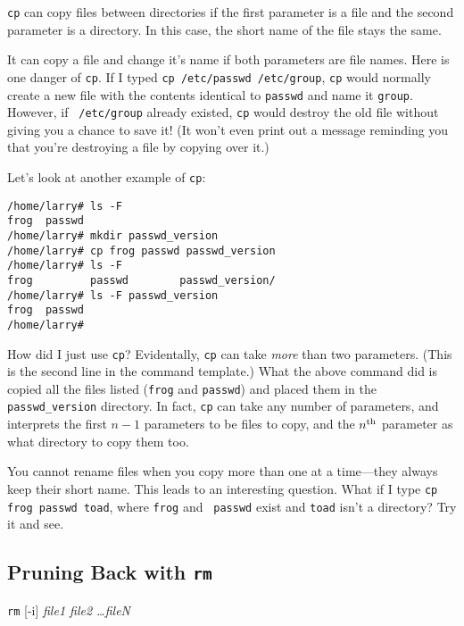 {\tt cp} can copy files between directories if the first parameter is a
file and the second parameter is a directory.  In this case, the short
name of the file stays the same.

It can copy a file and change it's name if both parameters are file
names. Here is one danger of {\tt cp}. If I typed {\tt cp /etc/passwd
/etc/group}, {\tt cp} would normally create a new file with the contents
identical to {\tt passwd} and name it {\tt group}.  However, if {\tt
/etc/group} already existed, {\tt cp} would destroy the old file without
giving you a chance to save it!  (It won't even print out a message
reminding you that you're destroying a file by copying over it.)

Let's look at another example of {\tt cp}:
\begin{screen}\begin{verbatim}
/home/larry# ls -F
frog  passwd
/home/larry# mkdir passwd_version
/home/larry# cp frog passwd passwd_version
/home/larry# ls -F
frog         passwd        passwd_version/
/home/larry# ls -F passwd_version
frog  passwd
/home/larry#
\end{verbatim}
\end{screen}

How did I just use {\tt cp}? Evidentally, {\tt cp} can take {\em
  more\/} than two parameters.  (This is the second line in the
command template.)  What the above command did is copied all the files
listed ({\tt frog} and {\tt passwd}) and placed them in the {\tt
  passwd\_version} directory. In fact, {\tt cp} can take any number of
parameters, and interprets the first $n-1$ parameters to be files to
copy, and the $n^{\rm th}$ parameter as what directory to copy them
too.

\cautionpar You cannot rename files when you copy more than one at a
time---they always keep their short name. This leads to an interesting
question. What if I type {\tt cp frog passwd toad}, where {\tt frog} and {\tt
passwd} exist and {\tt toad} isn't a directory? Try it and see.


\subsection{Pruning Back with {\tt rm}}

\begin{command}
{\tt rm} [-i] {\sl file1 file2 \ldots fileN}
\end{command}

